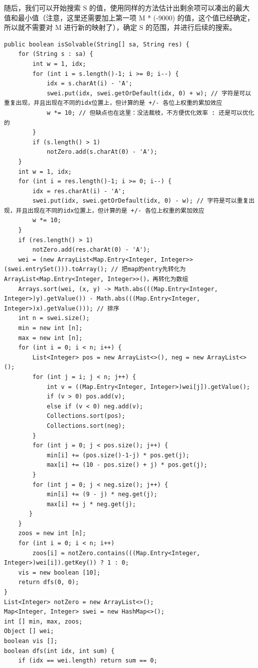 \documentclass[9pt, b5paaper]{book}
\begin{document}
\begin{enumerate}
随后，我们可以开始搜索 S 的值，使用同样的方法估计出剩余项可以凑出的最大值和最小值（注意，这里还需要加上第一项 M * (-9000) 的值，这个值已经确定，所以就不需要对 M 进行新的映射了），确定 S 的范围，并进行后续的搜索。
\begin{verbatim}
public boolean isSolvable(String[] sa, String res) {
    for (String s : sa) {
        int w = 1, idx;
        for (int i = s.length()-1; i >= 0; i--) {
            idx = s.charAt(i) - 'A';
            swei.put(idx, swei.getOrDefault(idx, 0) + w); // 字符是可以重复出现，并且出现在不同的idx位置上，但计算的是 +/- 各位上权重的累加效应
            w *= 10; // 但缺点也在这里：没法裁枝，不方便优化效率 : 还是可以优化的
        }
        if (s.length() > 1)
            notZero.add(s.charAt(0) - 'A');
    }
    int w = 1, idx;
    for (int i = res.length()-1; i >= 0; i--) {
        idx = res.charAt(i) - 'A';
        swei.put(idx, swei.getOrDefault(idx, 0) - w); // 字符是可以重复出现，并且出现在不同的idx位置上，但计算的是 +/- 各位上权重的累加效应
        w *= 10;
    }
    if (res.length() > 1)
        notZero.add(res.charAt(0) - 'A');
    wei = (new ArrayList<Map.Entry<Integer, Integer>>(swei.entrySet())).toArray(); // 把map的entry先转化为ArrayList<Map.Entry<Integer, Integer>>()，再转化为数组
    Arrays.sort(wei, (x, y) -> Math.abs(((Map.Entry<Integer, Integer>)y).getValue()) - Math.abs(((Map.Entry<Integer, Integer>)x).getValue())); // 排序
    int n = swei.size(); 
    min = new int [n];
    max = new int [n];
    for (int i = 0; i < n; i++) {
        List<Integer> pos = new ArrayList<>(), neg = new ArrayList<>();
        for (int j = i; j < n; j++) {
            int v = ((Map.Entry<Integer, Integer>)wei[j]).getValue();
            if (v > 0) pos.add(v);
            else if (v < 0) neg.add(v);
            Collections.sort(pos);
            Collections.sort(neg);
        }
        for (int j = 0; j < pos.size(); j++) {
            min[i] += (pos.size()-1-j) * pos.get(j);
            max[i] += (10 - pos.size() + j) * pos.get(j);
        }
        for (int j = 0; j < neg.size(); j++) {
            min[i] += (9 - j) * neg.get(j);
            max[i] += j * neg.get(j);
       }
    }
    zoos = new int [n];
    for (int i = 0; i < n; i++) 
        zoos[i] = notZero.contains(((Map.Entry<Integer, Integer>)wei[i]).getKey()) ? 1 : 0;
    vis = new boolean [10];
    return dfs(0, 0);
}
List<Integer> notZero = new ArrayList<>();
Map<Integer, Integer> swei = new HashMap<>();
int [] min, max, zoos;
Object [] wei;
boolean vis [];
boolean dfs(int idx, int sum) {
    if (idx == wei.length) return sum == 0;

\end{verbatim}
\end{enumerate}
\end{document}
